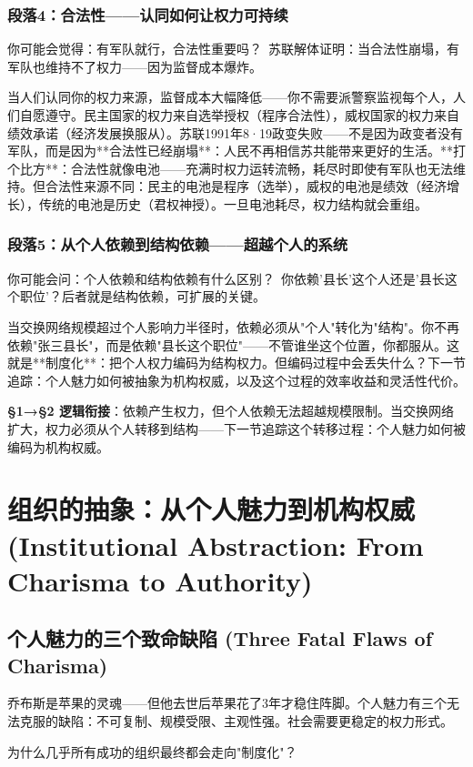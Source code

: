 \documentclass[openany, a4paper, 12pt]{book}
\newenvironment{motivation}{
	\vspace{0.5em}
	\begin{tcolorbox}[
		colback=gray!10,           %
		colframe=gray!60,          %
		title=\textit{本章动机 (Motivation)},
		fonttitle=\bfseries,
		arc=0mm,                   %
		leftrule=3mm               %
		]
		\small \itshape %
	}{
	\end{tcolorbox}
	\vspace{1em}
}
\begin{document}
\begin{motivation}
\begin{motivation}
\begin{motivation}
	\subsubsection*{段落4：合法性——认同如何让权力可持续}

	\begin{tcolorbox}[colback=yellow!5, title=\textit{读者行为预测}]
		你可能会觉得：有军队就行，合法性重要吗？\ 苏联解体证明：当合法性崩塌，有军队也维持不了权力——因为监督成本爆炸。
	\end{tcolorbox}

当人们认同你的权力来源，监督成本大幅降低——你不需要派警察监视每个人，人们自愿遵守。民主国家的权力来自选举授权（程序合法性），威权国家的权力来自绩效承诺（经济发展换服从）。苏联1991年8·19政变失败——不是因为政变者没有军队，而是因为**合法性已经崩塌**：人民不再相信苏共能带来更好的生活。**打个比方**：合法性就像电池——充满时权力运转流畅，耗尽时即使有军队也无法维持。但合法性来源不同：民主的电池是程序（选举），威权的电池是绩效（经济增长），传统的电池是历史（君权神授）。一旦电池耗尽，权力结构就会重组。

	\subsubsection*{段落5：从个人依赖到结构依赖——超越个人的系统}

	\begin{tcolorbox}[colback=yellow!5, title=\textit{读者行为预测}]
		你可能会问：个人依赖和结构依赖有什么区别？\ 你依赖'县长'这个人还是'县长这个职位'？后者就是结构依赖，可扩展的关键。
	\end{tcolorbox}

当交换网络规模超过个人影响力半径时，依赖必须从"个人"转化为"结构"。你不再依赖"张三县长"，而是依赖"县长这个职位"——不管谁坐这个位置，你都服从。这就是**制度化**：把个人权力编码为结构权力。但编码过程中会丢失什么？下一节追踪：个人魅力如何被抽象为机构权威，以及这个过程的效率收益和灵活性代价。

	\textbf{§1→§2 逻辑衔接}：依赖产生权力，但个人依赖无法超越规模限制。当交换网络扩大，权力必须从个人转移到结构——下一节追踪这个转移过程：个人魅力如何被编码为机构权威。
	\section{组织的抽象：从个人魅力到机构权威 (Institutional Abstraction: From Charisma to Authority)}

	\subsection{个人魅力的三个致命缺陷 (Three Fatal Flaws of Charisma)}
	\begin{motivation}
		乔布斯是苹果的灵魂——但他去世后苹果花了3年才稳住阵脚。个人魅力有三个无法克服的缺陷：不可复制、规模受限、主观性强。社会需要更稳定的权力形式。
	\end{motivation}
	\begin{questionbox}
		为什么几乎所有成功的组织最终都会走向"制度化"？
	\end{questionbox}


\end{motivation}
\end{motivation}
\end{motivation}
\end{document}
